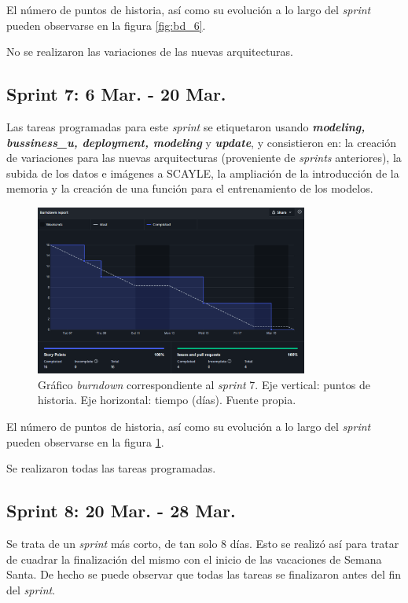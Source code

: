 El número de puntos de historia, así como su evolución a lo largo del \textit{sprint} pueden observarse en la figura \ref{fig:bd_6}.

No se realizaron las variaciones de las nuevas arquitecturas.

\subsection{Sprint 7: 6 Mar. - 20 Mar.}

Las tareas programadas para este \textit{sprint} se etiquetaron usando \textbf{\textit{modeling, bussiness\_u, deployment, modeling}} y \textbf{\textit{update}}, y consistieron en: la creación de variaciones para las nuevas arquitecturas (proveniente de \textit{sprints} anteriores), la subida de los datos e imágenes a SCAYLE, la ampliación de la introducción de la memoria y la creación de una función para el entrenamiento de los modelos. 

\begin{figure}[h]
    \centering
    \includegraphics[width=0.8\textwidth]{img/bd_6mar.png}
    \caption{Gráfico \textit{burndown} correspondiente al \textit{sprint} 7. Eje vertical: puntos de historia. Eje horizontal: tiempo (días). Fuente propia.}
    \label{fig:bd_7}
\end{figure}

El número de puntos de historia, así como su evolución a lo largo del \textit{sprint} pueden observarse en la figura \ref{fig:bd_7}.

Se realizaron todas las tareas programadas.

\subsection{Sprint 8: 20 Mar. - 28 Mar.}

Se trata de un \textit{sprint} más corto, de tan solo 8 días. Esto se realizó así para tratar de cuadrar la finalización del mismo con el inicio de las vacaciones de Semana Santa. De hecho se puede observar que todas las tareas se finalizaron antes del fin del \textit{sprint}.

